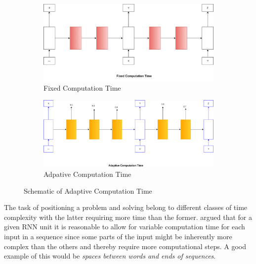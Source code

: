 
\begin{figure}[ht] 
	\begin{subfigure}[b]{0.5\linewidth}
		\centering
		\includegraphics[width=0.9\linewidth]{./figs/act1-eps}
		\caption{Fixed Computation Time}
		\label{fixed} 
		\vspace{4ex}
	\end{subfigure}%
	\begin{subfigure}[b]{0.5\linewidth}
		\centering
		\includegraphics[width=0.95\linewidth]{./figs/act2-eps}
		\caption{Adpative Computation Time} 
		\label{adaptive}  
		\vspace{4ex}
	\end{subfigure}
	\caption{\small Schematic of Adaptive Computation Time}
	\label{mtv:ponder}
\end{figure}
The task of positioning a problem and solving belong to different classes of time complexity with the latter requiring more time than the former. \cite{Graves2016} argued that for a given RNN unit it is reasonable to allow for variable computation time for each input in a sequence since some parts of the input might be inherently more complex than the others and thereby require more computational steps. A good example of this would be \textit{spaces between words and ends of sequences}. 

